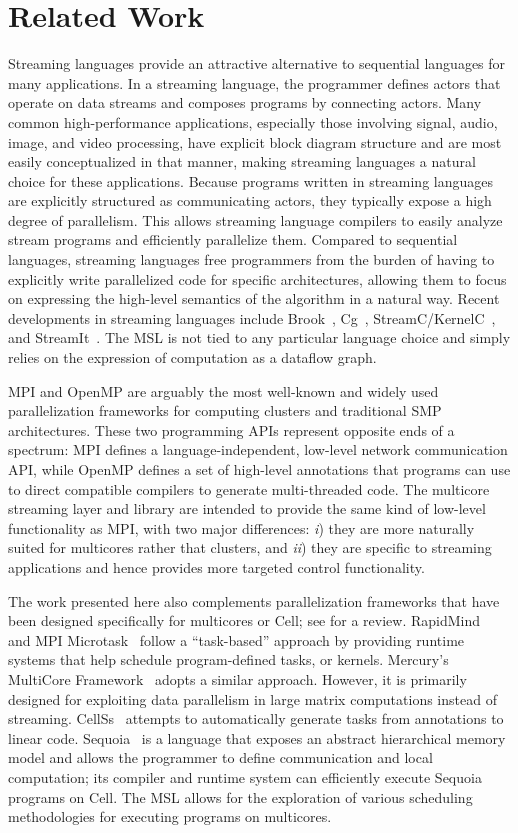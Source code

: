 \section{Related Work}\label{ch:bg}

Streaming languages provide an attractive alternative to sequential
languages for many applications. In a streaming language, the
programmer defines actors that operate on data streams and composes
programs by connecting actors. Many common high-performance
applications, especially those involving signal, audio, image, and
video processing, have explicit block diagram structure and are most
easily conceptualized in that manner, making streaming languages a
natural choice for these applications.
Because programs written in streaming languages are explicitly
structured as communicating actors, they typically expose a high
degree of parallelism. This allows streaming language compilers to
easily analyze stream programs and efficiently parallelize
them. Compared to sequential languages, streaming languages free
programmers from the burden of having to explicitly write parallelized
code for specific architectures, allowing them to focus on expressing
the high-level semantics of the algorithm in a natural way.
Recent developments in streaming languages include Brook~\cite{brook},
Cg~\cite{cg}, StreamC/KernelC~\cite{streamc}, and StreamIt~\cite{streamitweb}.
The MSL is not tied to any particular language choice and simply
relies on the expression of computation as a dataflow graph.
 
MPI and OpenMP are arguably the most well-known and widely used
parallelization frameworks for computing clusters and traditional SMP
architectures. These two programming APIs represent opposite ends of a
spectrum: MPI defines a language-independent, low-level network
communication API, while OpenMP defines a set of  high-level
annotations that programs can use to direct compatible compilers to
generate multi-threaded code.  The multicore streaming layer and
library are intended to provide the same kind of low-level
functionality as MPI, with two major differences: \emph{i}) they are
more naturally suited for multicores rather that clusters, and
\emph{ii}) they are specific to streaming applications and hence provides
more targeted control functionality.

The work presented here also complements parallelization frameworks
that have been designed specifically for multicores or Cell; see
\cite{cell:pf} for a review. RapidMind~\cite{rapidmind} and MPI
Microtask~\cite{mpimicrotask} follow a ``task-based'' approach by
providing runtime systems that help schedule program-defined tasks, or
kernels. Mercury's MultiCore Framework~\cite{mcf} adopts a similar
approach. However, it is primarily designed for exploiting data
parallelism in large matrix computations instead of streaming.
CellSs~\cite{cellss} attempts to automatically generate tasks from
annotations to linear code. Sequoia~\cite{sequoia} is a language that
exposes an abstract hierarchical memory model and allows the
programmer to define communication and local computation; its compiler
and runtime system can efficiently execute Sequoia programs on
Cell. The MSL allows for the exploration of various scheduling
methodologies for executing programs on multicores.

